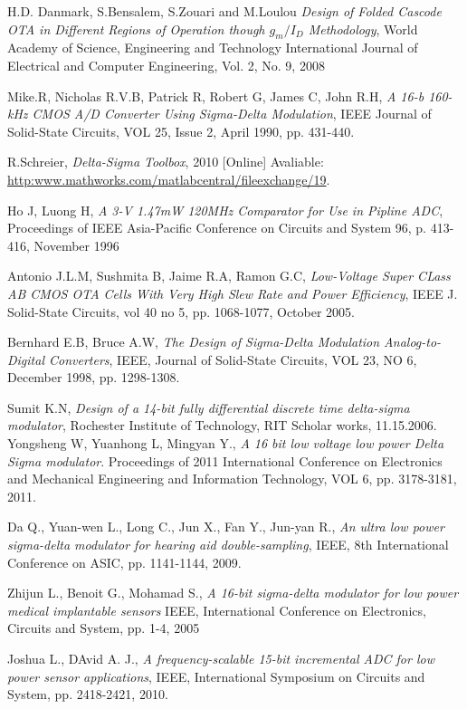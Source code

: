\begin{thebibliography}{9}
H.D. Danmark, S.Bensalem, S.Zouari and M.Loulou
\textit{Design of Folded Cascode OTA in Different Regions of Operation though $g_m/I_D$ Methodology},
World Academy of Science, Engineering and Technology International Journal of Electrical and Computer Engineering, Vol. 2, No. 9, 2008

Mike.R, Nicholas R.V.B, Patrick R, Robert G, James C, John R.H,
\textit{A 16-b 160-kHz CMOS A/D Converter Using Sigma-Delta Modulation},
IEEE Journal of Solid-State Circuits, VOL 25, Issue 2, April 1990, pp. 431-440.

R.Schreier,
\textit{Delta-Sigma Toolbox},
2010
[Online]
Avaliable:
\url{http:www.mathworks.com/matlabcentral/fileexchange/19}.

Ho J, Luong H,
\textit{A 3-V 1.47mW 120MHz Comparator for Use in Pipline ADC},
Proceedings of IEEE Asia-Pacific Conference on Circuits and System 96, p. 413-416, November 1996

Antonio J.L.M, Sushmita B, Jaime R.A, Ramon G.C,
\textit{Low-Voltage Super CLass AB CMOS OTA Cells With Very High Slew Rate and Power Efficiency},
IEEE J. Solid-State Circuits, vol 40 no 5, pp. 1068-1077, October 2005.

Bernhard E.B, Bruce A.W,
\textit{The Design of Sigma-Delta Modulation Analog-to-Digital Converters},
IEEE, Journal of Solid-State Circuits, VOL 23, NO 6, December 1998, pp. 1298-1308.

Sumit K.N, 
\textit{Design of a 14-bit fully differential discrete time delta-sigma modulator},
Rochester Institute of Technology, RIT Scholar works, 11.15.2006.
Yongsheng W, Yuanhong L, Mingyan Y.,
\textit{A 16 bit low voltage low power Delta Sigma modulator}.
Proceedings of 2011 International Conference on Electronics and Mechanical Engineering and Information Technology, VOL 6, pp. 3178-3181, 2011.

Da Q., Yuan-wen L., Long C., Jun X., Fan Y., Jun-yan R.,
\textit{An ultra low power sigma-delta modulator for hearing aid double-sampling},
IEEE, 8th International Conference on ASIC, pp. 1141-1144, 2009.

Zhijun L., Benoit G., Mohamad S., 
\textit{A 16-bit sigma-delta modulator for low power medical implantable sensors}
IEEE, International Conference on Electronics, Circuits and System, pp. 1-4, 2005

Joshua L., DAvid A. J., 
\textit{A frequency-scalable 15-bit incremental ADC for low power sensor applications},
IEEE, International Symposium on Circuits and System, pp. 2418-2421, 2010.


\end{thebibliography}
